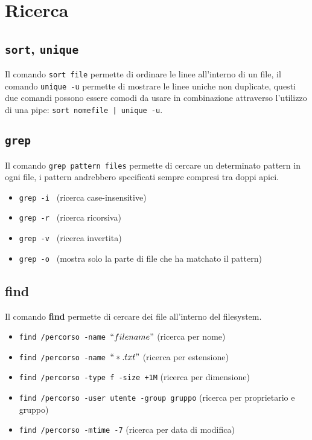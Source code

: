 \section{Ricerca}
\subsection{\texttt{sort}, \texttt{unique}}
Il comando \texttt{sort file} permette di ordinare le linee
all'interno di un file, il comando \texttt{unique -u} permette
di mostrare le linee uniche non duplicate, questi due comandi
possono essere comodi da usare in combinazione attraverso l'utilizzo
di una pipe: \texttt{sort nomefile | unique -u}.

\subsection{\texttt{grep}}
Il comando \texttt{grep pattern files} permette di cercare un determinato pattern in ogni file, i pattern andrebbero specificati sempre compresi tra doppi apici.

\begin{itemize}
    \item \texttt{grep -i } (ricerca case-insensitive)
    \item \texttt{grep -r } (ricerca ricorsiva)
    \item \texttt{grep -v } (ricerca invertita)
    \item \texttt{grep -o } (mostra solo la parte di file che ha
    matchato il pattern)
\end{itemize}

\subsection{find}
Il comando \textbf{find} permette di cercare dei file all'interno del filesystem.

\begin{itemize}
    \item \texttt{find /percorso -name $``filename"$} (ricerca per nome)
    \item \texttt{find /percorso -name $``*.txt"$} (ricerca per estensione)
    \item \texttt{find /percorso -type f -size +1M} (ricerca per dimensione)
    \item \texttt{find /percorso -user utente -group gruppo} (ricerca per proprietario e gruppo)
    \item \texttt{find /percorso -mtime -7} (ricerca per data di modifica)
\end{itemize}

